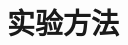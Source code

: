 \documentclass[10pt]{beamer}
\begin{document}



        
        
    


\section{实验方法}
\end{document}
